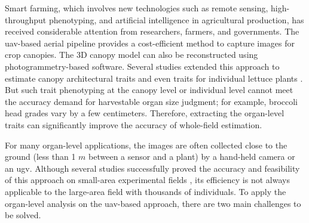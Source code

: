 
Smart farming, which involves new technologies such as remote sensing, high-throughput phenotyping, and artificial intelligence in agricultural production, has received considerable attention from researchers, farmers, and governments. The \gls{uav}-based aerial pipeline provides a cost-efficient method to capture images for crop canopies. The 3D canopy model can also be reconstructed using photogrammetry-based software. Several studies extended this approach to estimate canopy architectural traits \citep{shu_application_2021, wang_detection_2021, herrero_canopy_2020} and even traits for individual lettuce plants \citep{bauer_combining_2019}. But such trait phenotyping at the canopy level or individual level cannot meet the accuracy demand for harvestable organ size judgment; for example, broccoli head grades vary by a few centimeters. Therefore, extracting the organ-level traits can significantly improve the accuracy of whole-field estimation.

For many organ-level applications, the images are often collected close to the ground (less than 1 $m$ between a sensor and a plant) by a hand-held camera or an \gls{ugv}. Although several studies successfully proved the accuracy and feasibility of this approach on small-area experimental fields \citep{luling_using_2021,garcia_towards_2021,blok_effect_2021}, its efficiency is not always applicable to the large-area field with thousands of individuals. To apply the organ-level analysis on the \gls{uav}-based approach, there are two main challenges to be solved.

